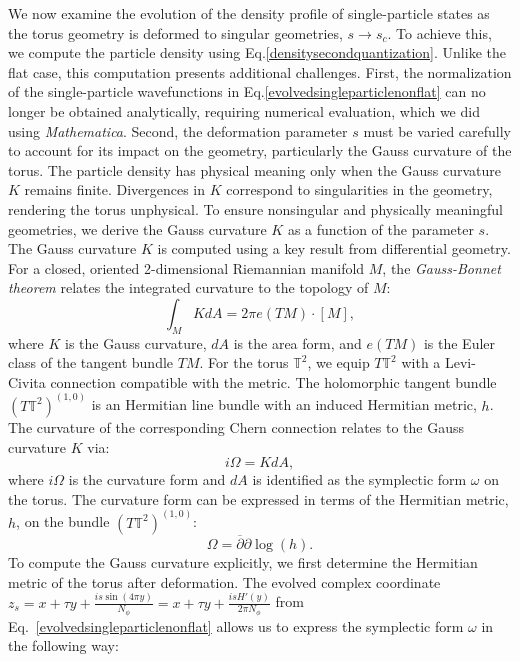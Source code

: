 \documentclass[a4paper,11pt]{article}
\begin{document}
We now examine the evolution of the density profile of single-particle states as the torus geometry is deformed to singular geometries, $s \to s_c$. To achieve this, we compute the particle density using Eq.\eqref{densitysecondquantization}. Unlike the flat case, this computation presents additional challenges. First, the normalization of the single-particle wavefunctions in Eq.\eqref{evolvedsingleparticlenonflat} can no longer be obtained analytically, requiring numerical evaluation, which we did using \textit{Mathematica}. Second, the deformation parameter $s$ must be varied carefully to account for its impact on the geometry, particularly the Gauss curvature of the torus. The particle density has physical meaning only when the Gauss curvature $K$ remains finite. Divergences in $K$ correspond to singularities in the geometry, rendering the torus unphysical. To ensure nonsingular and physically meaningful geometries, we derive the Gauss curvature $K$ as a function of the parameter $s$.
The Gauss curvature $K$ is computed using a key result from differential geometry. For a closed, oriented 2-dimensional Riemannian manifold $M$, the \textit{Gauss-Bonnet theorem} relates the integrated curvature to the topology of $M$:
\begin{equation}
    \int_{M} KdA = 2\pi e(TM)\cdot[M],
\end{equation}
where $K$ is the Gauss curvature, $dA$ is the area form, and $e(TM)$ is the Euler class of the tangent bundle $TM$. For the torus $\mathbb{T}^2$, we  equip $T\mathbb{T}^2$ with a Levi-Civita connection compatible with the metric. The holomorphic tangent bundle $(T\mathbb{T}^2)^{(1,0)}$ is an Hermitian line bundle with an induced Hermitian metric, $h$. The curvature of the corresponding Chern connection relates to the Gauss curvature $K$ via:
\begin{equation}
    i\Omega = KdA,
    \label{eq:curvature_gauss_curvature}
\end{equation}
where $i\Omega$ is the curvature form and $dA$ is identified as the symplectic form $\omega$ on the torus. The curvature form can be expressed in terms of the Hermitian metric, $h$, on the bundle $(T\mathbb{T}^2)^{(1,0)}$:
\begin{equation}
    \Omega = \overline{\partial}\partial\log(h).
    \label{eq:curvature_hermitian_metric}
\end{equation}
To compute the Gauss curvature explicitly, we first determine the Hermitian metric of the torus after deformation. The evolved complex coordinate $z_s=x+\tau y+\frac{is \sin{(4\pi y)}}{N_\phi}=x+\tau y + \frac{is H'(y)}{2\pi N_{\phi}}$ from Eq.~\eqref{evolvedsingleparticlenonflat} allows us to express the symplectic form $\omega$ in the following way:
\end{document}
